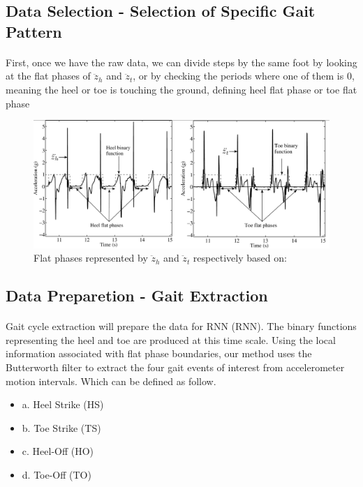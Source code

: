\subsection{Data Selection - Selection of Specific Gait Pattern}
\STANDARD{\insertsection}
{
\framesubtitle{\insertsubsection}
First, once we have the raw data, we can divide steps by the same foot by looking at the flat phases of $\ddot{z}_h$ and $\ddot{z}_t$, or by checking the periods where one of them is 0, meaning the heel or toe is touching the ground, defining heel flat phase or toe flat phase

\begin{figure}[ht]
    \centering
    \includegraphics[scale=0.15]{img/flat-phases.png}
    \caption{Flat phases represented by $\ddot{z}_h$ and $\ddot{z}_t$ respectively based on: \cite{Mohamed2015}}
    \label{fig:Flat phases represented by heel flat phase or toe flat phase}
\end{figure}
}

\subsection{Data Preparetion - Gait Extraction}
\STANDARD{\insertsection}
{
\framesubtitle{\insertsubsection}
Gait cycle extraction will prepare the data for RNN (RNN). The binary functions representing the heel and toe are produced at this time scale. Using the local information associated with flat phase boundaries, our method uses the Butterworth filter to extract the four gait events of interest from accelerometer motion intervals. Which can be defined as follow.
\begin{itemize}
    \item a. Heel Strike (HS)
    \item b. Toe Strike (TS)
    \item c. Heel-Off (HO)
    \item d. Toe-Off (TO)
\end{itemize}
}

